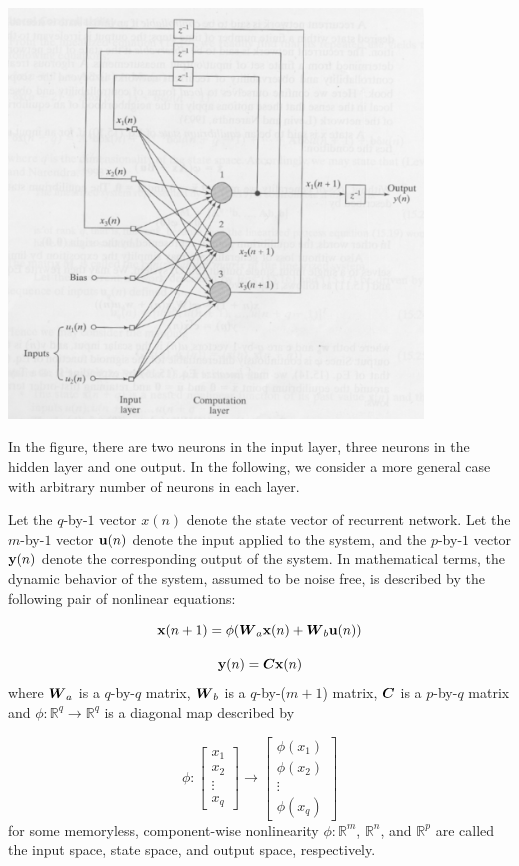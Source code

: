 \begin{enumerate}
  \hspace{2cm}\includegraphics[width=11cm]{l12k9.eps}

  \begin{solution}

    In the figure, there are two neurons in the input layer, three neurons in the hidden layer and one
    output. In the following, we consider a more general case with arbitrary number of neurons in each layer.

    Let the $q$-by-$1$ vector $x(n)$ denote the state vector of recurrent network. Let the $m$-by-$1$ vector ${\bf{u}}(n)$ 
    denote the input
    applied to the system, and the $p$-by-$1$ vector ${\bf{y}}(n)$ denote the
    corresponding output of the system. In mathematical terms, the dynamic
    behavior of the system, assumed to be noise free, is described by the
    following pair of nonlinear equations:

    \[
    {\bf{x}}(n+1) = \phi (\boldsymbol{W}_a {\bf{x}}(n) + \boldsymbol{W}_b {\bf{u}}(n))
    \]

    \[
    {\bf{y}}(n) = \boldsymbol{C} {\bf{x}}(n)
    \]
    where $\boldsymbol{W}_a$ is a $q$-by-$q$ matrix, $\boldsymbol{W}_b$ is a $q$-by-($m+1$) matrix, $\boldsymbol{C}$ is a
    $p$-by-$q$ matrix and $\phi: \mathbb{R}^q \rightarrow \mathbb{R}^q$ is a
    diagonal map described by

    \[
    \phi:
    \left[\begin{array}{c}
        x_1 \\
        x_2 \\
        \vdots \\
        x_q
      \end{array}\right]
    \rightarrow
    \left[\begin{array}{c}
        \phi(x_1) \\
        \phi(x_2) \\
        \vdots \\
        \phi(x_q)
      \end{array}\right]
    \]
    for some memoryless, component-wise nonlinearity $\phi: \mathbb{R}^m$,
    $\mathbb{R}^n$, and $\mathbb{R}^p$ are called the input space, state
    space, and output space, respectively.


\end{solution}
\end{enumerate}
